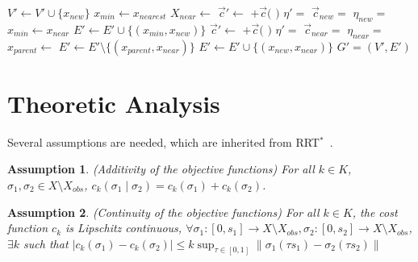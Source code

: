 \documentclass[conference]{IEEEtran}
\newtheorem{asmp}{Assumption}
\theoremstyle{definition}
\begin{document}
\begin{algorithm}
\begin{algorithmic}[1]
\State $ V' \leftarrow V' \cup \{ x_{new} \} $
\State $ x_{min} \leftarrow x_{nearest} $
\State $ X_{near} \leftarrow $ 
		\State $ \vec{c}' \leftarrow $  $ + \vec{c}( $  $ ) $ 
		\State $ \eta' =  $ 
		\State $ \vec{c}_{new} = $  
		\State $ \eta_{new} = $ 
			\State $ x_{min} \leftarrow x_{near} $
		\EndIf
	\EndIf
\EndFor
\State $ E' \leftarrow E' \cup \{ ( x_{min}, x_{new} ) \} $
		\State $ \vec{c}' \leftarrow $  $ + \vec{c}( $  $ ) $ 
		\State $ \eta' =  $ 
		\State $ \vec{c}_{near} = $  
		\State $ \eta_{near} = $ 
			\State $ x_{parent} \leftarrow $ 
			\State $ E' \leftarrow E' \setminus \{ ( x_{parent}, x_{near} ) \} $
			\State $ E' \leftarrow E' \cup \{ ( x_{new}, x_{near} ) \} $
		\EndIf
	\EndIf
\EndFor
\Return $ G' = (V', E') $ 
\end{algorithmic}
\label{alg:morrtstar:extend:sub}
\caption{ $ \mbox{Extend}_{Sub} (G, x) $}
\end{algorithm} 


\section{Theoretic Analysis}
\label{sec:theoretic_analysis}

Several assumptions are needed, which are inherited from RRT$^{*}$~\cite{Karaman.Frazzoli:RSS10}.
\begin{asmp}{(Additivity of the objective functions)}
For all $ k \in K $, $ \sigma_{1} , \sigma_{2} \in X \setminus X_{obs} $,
$ c_{k} ( \sigma_{1}  \mid \sigma_{2} ) = c_{k} ( \sigma_{1} ) + c_{k} ( \sigma_{2} ) $.
\end{asmp}

\begin{asmp}{(Continuity of the objective functions)}
For all $ k \in K $, the cost function $ c_{k} $ is Lipschitz continuous,
$ \forall \sigma_{1} : [ 0, s_{1} ] \rightarrow X \setminus X_{obs}, \sigma_{2} : [0, s_{2} ] \rightarrow X \setminus X_{obs} $,
$ \exists k $ such that 
$ | c_{k} ( \sigma_{1} ) - c_{k} ( \sigma_{2} ) | \leq k \sup_{\tau \in [0,1]} \lVert \sigma_{1} (\tau s_{1}) - \sigma_{2} (\tau s_{2}) \rVert $
\end{asmp}
\end{document}

